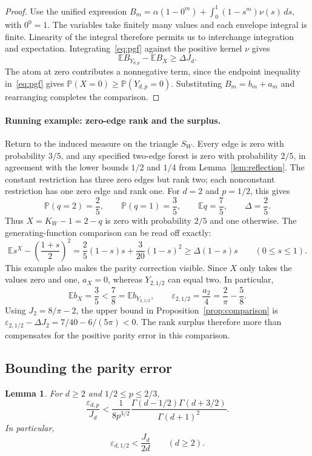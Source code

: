 \documentclass[11pt,reqno]{amsart}
\newtheorem{lemma}[theorem]{Lemma}
\theoremstyle{remark}
\numberwithin{equation}{section}
\newcommand{\E}{\mathbb E}
\newcommand{\PP}{\mathbb P}
\begin{document}
\begin{proof}
Use the unified expression
$B_m=\alpha(1-0^m)+\int_0^1(1-s^m)\nu(s)\,ds$, with $0^0=1$.
The variables take finitely many values and each envelope integral is
finite. Linearity of the integral therefore permits us to interchange
integration and expectation. Integrating~\eqref{eq:pgf} against the
positive kernel $\nu$ gives
\[
 \E B_{Y_{d,p}}-\E B_X\ge\Delta J_d.
\]
The atom at zero contributes a nonnegative term, since the endpoint
inequality in~\eqref{eq:pgf} gives $\PP(X=0)\ge\PP(Y_{d,p}=0)$.
Substituting $B_m=b_m+a_m$ and rearranging completes the comparison.
\end{proof}

\paragraph{Running example: zero-edge rank and the surplus.}
Return to the induced measure on the triangle $S_W$.
Every edge is zero with probability $3/5$, and any specified two-edge
forest is zero with probability $2/5$, in agreement with the lower
bounds $1/2$ and $1/4$ from Lemma~\ref{lem:reflection}.
The constant restriction has three zero edges but rank two;
each nonconstant restriction has one zero edge and rank one.
For $d=2$ and $p=1/2$, this gives
\[
 \PP(q=2)=\frac25,\qquad \PP(q=1)=\frac35,\qquad
 \E q=\frac75,\qquad \Delta=\frac25.
\]
Thus $X=K_W-1=2-q$ is zero with probability $2/5$ and one otherwise.
The generating-function comparison can be read off exactly:
\[
 \E s^X-\left(\frac{1+s}{2}\right)^2
   =\frac25(1-s)s+\frac3{20}(1-s)^2
   \ge\Delta(1-s)s\qquad(0\le s\le1).
\]
This example also makes the parity correction visible. Since $X$
only takes the values zero and one, $a_X=0$, whereas $Y_{2,1/2}$
can equal two. In particular,
\[
 \E b_X=\frac35<\frac78=\E b_{Y_{2,1/2}},\qquad
 \varepsilon_{2,1/2}=\frac{a_2}{4}=\frac2\pi-\frac58.
\]
Using $J_2=8/\pi-2$, the upper bound in
Proposition~\ref{prop:comparison} is
$\varepsilon_{2,1/2}-\Delta J_2=7/40-6/(5\pi)<0$.
The rank surplus therefore more than compensates for the positive
parity error in this comparison.


\subsection{Bounding the parity error}

\begin{lemma}\label{lem:budget}
For $d\ge2$ and $1/2\le p\le2/3$,
\begin{equation}\label{eq:general-budget}
 \frac{\varepsilon_{d,p}}{J_d}
 <\frac{1}{8p^{3/2}}
   \frac{\Gamma(d-1/2)\Gamma(d+3/2)}{\Gamma(d+1)^2}.
\end{equation}
In particular,
\begin{equation}\label{eq:half-budget}
 \varepsilon_{d,1/2}<\frac{J_d}{2d}\qquad(d\ge2).
\end{equation}
\end{lemma}
\end{document}
